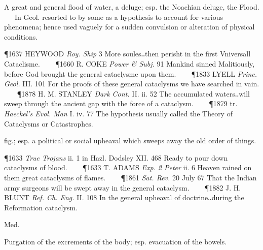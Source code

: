 \begin{description}[wide, labelwidth=!, labelindent=0pt]
\noindent {}

\vspace{-0.3cm}

\begin{myenumerate}

 A great and general flood of water, a deluge; esp. the Noachian deluge, the Flood.
   In Geol. resorted to by some as a hypothesis to account for various phenomena; hence used vaguely for a sudden convulsion or alteration of physical conditions.

\P 1637 HEYWOOD  \textit{Roy. Ship} 3 More soules‥then perisht in the first Vniversall Cataclisme.    
\P 1660 R. COKE  \textit{Power \& Subj.} 91 Mankind sinned Malitiously, before God brought the general cataclysme upon them.    
\P 1833 LYELL  \textit{Princ. Geol.} III. 101 For the proofs of these general cataclysms we have searched in vain.    
\P 1878 H. M. STANLEY  \textit{Dark Cont.} II. ii. 52 The accumulated waters‥will sweep through the ancient gap with the force of a cataclysm.    
\P 1879 tr. \textit{Haeckel's Evol. Man} I. iv. 77 The hypothesis usually called the Theory of Cataclysms or Catastrophes.

 fig.; esp. a political or social upheaval which sweeps away the old order of things.

\P 1633 \textit{True  Trojans} ii. 1 in Hazl. Dodsley XII. 468 Ready to pour down cataclysms of blood.    
\P 1633 T. ADAMS  \textit{Exp. 2 Peter} ii. 6 Heaven rained on them great cataclysms of flames.    
\P 1861  \textit{Sat. Rev.} 20 July 67 That the Indian army surgeons will be swept away in the general cataclysm.    
\P 1882 J. H. BLUNT  \textit{Ref. Ch. Eng.} II. 108 In the general upheaval of doctrine‥during the Reformation cataclysm.
\end{myenumerate}


 Med.

\noindent {}

\vspace{-0.3cm}

\begin{myenumerate}

 Purgation of the excrements of the body; esp. evacuation of the bowels.


\end{myenumerate}
\end{description}
